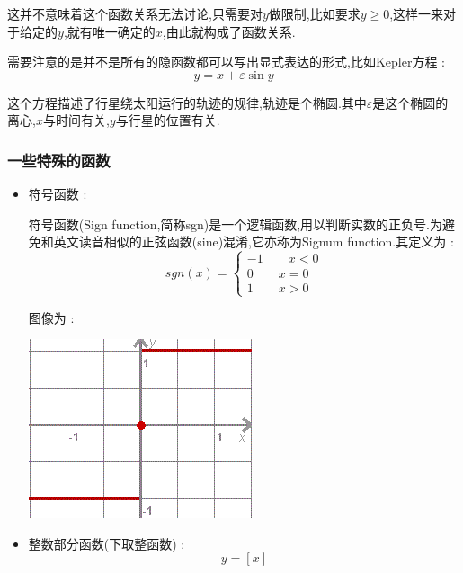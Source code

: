{{{\begin{itemize}
{              这并不意味着这个函数关系无法讨论,只需要对$y$做限制,比如要求$y \geq 0$,这样一来对于给定的$y$,就有唯一确定的$x$,由此就构成了函数关系.

              需要注意的是并不是所有的隐函数都可以写出显式表达的形式,比如Kepler方程 : $$
                  y = x + \varepsilon \sin y
              $$

              这个方程描述了行星绕太阳运行的轨迹的规律,轨迹是个椭圆.其中$\varepsilon$是这个椭圆的离心,$x$与时间有关,$y$与行星的位置有关.
              }
    \end{itemize}
}%

\subsubsection{一些特殊的函数}{
    \begin{itemize}
        \item {
              符号函数 :

              符号函数(Sign function,简称sgn)是一个逻辑函数,用以判断实数的正负号.为避免和英文读音相似的正弦函数(sine)混淆,它亦称为Signum function.其定义为 : $$
                  sgn(x) = \begin{cases}
                      -1\qquad x < 0 \\
                      0\qquad x = 0  \\
                      1\qquad x > 0
                  \end{cases}
              $$


              图像为 :

              \begin{center}
                  \includegraphics[scale=0.5]{resources/Signum_function.png}
              \end{center}
              }
        \item {
              整数部分函数(下取整函数) :$$
                  y = [x]
              $$

}
\end{itemize}}}}
